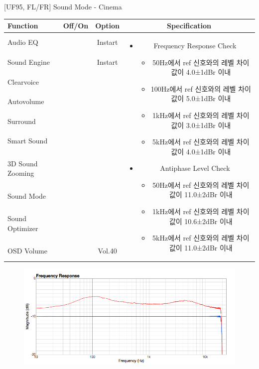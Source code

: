 \begin{frame}[t]{[UF95, FL/FR] Sound Mode - Cinema}
\begin{tiny}
\begin{tabular}{@{}lccc@{}}
\toprule
Function & Off/On & Option & Specification \\
\midrule
Audio EQ & \color{black}{Off} & Instart &
\multirow{10}{60mm}{
\begin{itemize}
\item Frequency Response Check
	\begin{itemize}
	\item 50Hz에서 ref 신호와의 레벨 차이값이 4.0±1dBr 이내
	\item 100Hz에서 ref 신호와의 레벨 차이값이 5.0±1dBr 이내
	\item 1kHz에서 ref 신호와의 레벨 차이값이 3.0±1dBr 이내
	\item 5kHz에서 ref 신호와의 레벨 차이값이 4.0±1dBr 이내
	\end{itemize}
\item Antiphase Level Check
	\begin{itemize}
	\item 50Hz에서 ref 신호와의 레벨 차이값이 11.0±2dBr 이내
	\item 1kHz에서 ref 신호와의 레벨 차이값이 10.6±2dBr 이내
	\item 5kHz에서 ref 신호와의 레벨 차이값이 11.0±2dBr 이내
	\end{itemize}
\end{itemize}
} \\
Sound Engine & \color{blue}{On} & Instart & \\
Clearvoice & \color{black}{Off} & & \\
Autovolume & \color{black}{Off} & & \\
Surround & \color{black}{Off} & & \\
Smart Sound & \color{black}{Off} & & \\
3D Sound Zooming & \color{black}{Off} & & \\
Sound Mode & \color{blue}{On} & \color{blue}{Cinema} & \\
Sound Optimizer & \color{black}{Off} & & \\
OSD Volume & \color{blue}{On} & Vol.40 & \\
\midrule
\end{tabular}
\end{tiny}

\begin{figure}[b]
\includegraphics[height=0.4\textwidth]{figures/cinema_12.png}
\end{figure}

\end{frame}


